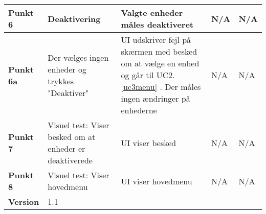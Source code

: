 \begin{center}
\begin{longtable}{|p{}|p{}|p{3cm}|p{3cm}|p{3cm}|}
\textbf{Punkt 6}		&Deaktivering			
					&Valgte enheder måles deaktiveret
					&N/A 
					&N/A \\\hline
															
\textbf{Punkt 6a}	&Der vælges ingen enheder og trykkes "Deaktiver"				
					&UI udskriver fejl på skærmen med besked om at vælge en enhed og går til UC2.\ref{uc3menu}	. 
					 Der måles ingen ændringer på enhederne
					&N/A 
					&N/A \\\hline
		
\textbf{Punkt 7}		&Visuel test: Viser besked om at enheder er deaktiverede
					&UI viser besked
					&N/A
					&N/A \\\hline
					
\textbf{Punkt 8}		&Visuel test: Viser hovedmenu
					&UI viser hovedmenu
					&N/A
					&N/A \\\hline
					
\textbf{Version}		&\multicolumn{4}{l|}{1.1} \\ \hline

	\end{longtable}
	\label{ATUC3} 
\end{center}